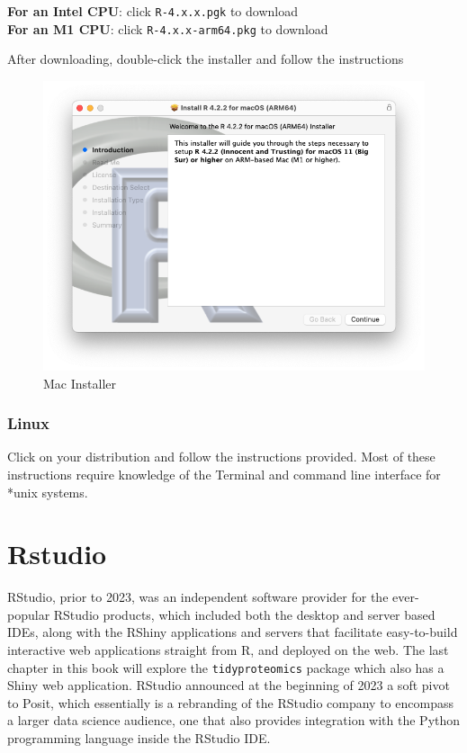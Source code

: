 \documentclass[
]{book}
\begin{document}
\textbf{For an Intel CPU}: click \texttt{R-4.x.x.pgk} to download\\
\textbf{For an M1 CPU}: click \texttt{R-4.x.x-arm64.pkg} to download

After downloading, double-click the installer and follow the instructions

\begin{figure}
\includegraphics[width=10.17in]{images/02_001_r_installer_mac_m1} \caption{\label{fig:2001}Mac Installer}\label{fig:2001}
\end{figure}

\hypertarget{linux}{%
\subsubsection*{Linux}\label{linux}}

Click on your distribution and follow the instructions provided. Most of these instructions require knowledge of the Terminal and command line interface for *unix systems.

\hypertarget{rstudio}{%
\section{Rstudio}\label{rstudio}}

RStudio, prior to 2023, was an independent software provider for the ever-popular RStudio products, which included both the desktop and server based IDEs, along with the RShiny applications and servers that facilitate easy-to-build interactive web applications straight from R, and deployed on the web. The last chapter in this book will explore the \texttt{tidyproteomics} package which also has a Shiny web application. RStudio announced at the beginning of 2023 a soft pivot to Posit, which essentially is a rebranding of the RStudio company to encompass a larger data science audience, one that also provides integration with the Python programming language inside the RStudio IDE.
\end{document}
